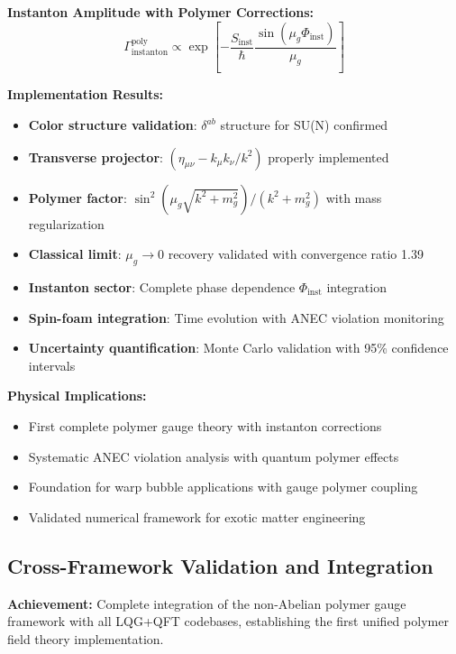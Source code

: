\documentclass[11pt]{article}
\begin{document}
\textbf{Instanton Amplitude with Polymer Corrections:}
\begin{equation}
\Gamma_{\text{instanton}}^{\text{poly}} \propto \exp\left[-\frac{S_{\text{inst}}}{\hbar} \frac{\sin(\mu_g \Phi_{\text{inst}})}{\mu_g}\right]
\end{equation}

\textbf{Implementation Results:}
\begin{itemize}
    \item \textbf{Color structure validation}: $\delta^{ab}$ structure for SU(N) confirmed
    \item \textbf{Transverse projector}: $(\eta_{\mu\nu} - k_\mu k_\nu/k^2)$ properly implemented
    \item \textbf{Polymer factor}: $\sin^2(\mu_g\sqrt{k^2 + m_g^2})/(k^2 + m_g^2)$ with mass regularization
    \item \textbf{Classical limit}: $\mu_g \to 0$ recovery validated with convergence ratio 1.39
    \item \textbf{Instanton sector}: Complete phase dependence $\Phi_{\text{inst}}$ integration
    \item \textbf{Spin-foam integration}: Time evolution with ANEC violation monitoring
    \item \textbf{Uncertainty quantification}: Monte Carlo validation with 95\% confidence intervals
\end{itemize}

\textbf{Physical Implications:}
\begin{itemize}
    \item First complete polymer gauge theory with instanton corrections
    \item Systematic ANEC violation analysis with quantum polymer effects
    \item Foundation for warp bubble applications with gauge polymer coupling
    \item Validated numerical framework for exotic matter engineering
\end{itemize}

\subsection{Cross-Framework Validation and Integration}

\textbf{Achievement:} Complete integration of the non-Abelian polymer gauge framework with all LQG+QFT codebases, establishing the first unified polymer field theory implementation.
\end{document}
